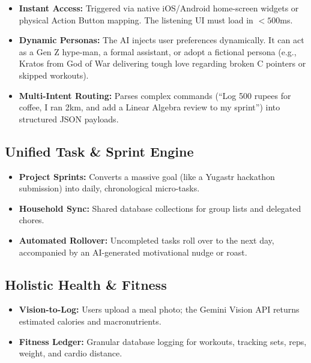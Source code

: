 \documentclass[11pt,oneside]{article}
\begin{document}
\begin{itemize}
  \item \textbf{Instant Access:} Triggered via native iOS/Android home-screen widgets or physical Action Button mapping. The listening UI must load in $< 500$ms.
  
  \item \textbf{Dynamic Personas:} The AI injects user preferences dynamically. It can act as a Gen Z hype-man, a formal assistant, or adopt a fictional persona (e.g., Kratos from God of War delivering tough love regarding broken C pointers or skipped workouts).
  
  \item \textbf{Multi-Intent Routing:} Parses complex commands (``Log 500 rupees for coffee, I ran 2km, and add a Linear Algebra review to my sprint'') into structured JSON payloads.
\end{itemize}

\subsection{Unified Task \& Sprint Engine}

\begin{itemize}
  \item \textbf{Project Sprints:} Converts a massive goal (like a Yugastr hackathon submission) into daily, chronological micro-tasks.
  
  \item \textbf{Household Sync:} Shared database collections for group lists and delegated chores.
  
  \item \textbf{Automated Rollover:} Uncompleted tasks roll over to the next day, accompanied by an AI-generated motivational nudge or roast.
\end{itemize}

\subsection{Holistic Health \& Fitness}

\begin{itemize}
  \item \textbf{Vision-to-Log:} Users upload a meal photo; the Gemini Vision API returns estimated calories and macronutrients.
  
  \item \textbf{Fitness Ledger:} Granular database logging for workouts, tracking sets, reps, weight, and cardio distance.
\end{itemize}
\end{document}
